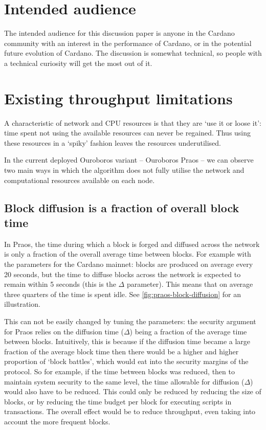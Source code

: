 \documentclass[11pt,a4paper]{article}
\begin{document}
\section*{Intended audience}

The intended audience for this discussion paper is anyone in the Cardano
community with an interest in the performance of Cardano, or in the potential
future evolution of Cardano. The discussion is somewhat technical, so people
with a technical curiosity will get the most out of it.

\tableofcontents{}

\section{Existing throughput limitations}

A characteristic of network and CPU resources is that they are `use it or loose
it': time spent not using the available resources can never be regained. Thus
using these resources in a `spiky' fashion leaves the resources underutilised.

In the current deployed Ouroboros variant -- Ouroboros Praos -- we can observe
two main ways in which the algorithm does not fully utilise the network and
computational resources available on each node.

\subsection{Block diffusion is a fraction of overall block time}

In Praos, the time during which a block is forged and diffused across the
network is only a fraction of the overall average time between blocks. For
example with the parameters for the Cardano mainnet: blocks are produced
on average every 20 seconds, but the time to diffuse blocks across the network
is expected to remain within 5 seconds (this is the $\Delta$ parameter). This
means that on average three quarters of the time is spent idle. See
\cref{fig:praos-block-diffusion} for an illustration.

This can not be easily changed by tuning the parameters: the security argument
for Praos relies on the diffusion time ($\Delta$) being a fraction of the
average time between blocks. Intuitively, this is because if the diffusion time
became a large fraction of the average block time then there would be a higher
and higher proportion of `block battles', which would eat into the security
margins of the protocol. So for example, if the time between blocks was reduced,
then to maintain system security to the same level, the time allowable for
diffusion ($\Delta$) would also have to be reduced. This could only be reduced
by reducing the size of blocks, or by reducing the time budget per block for
executing scripts in transactions. The overall effect would be to reduce
throughput, even taking into account the more frequent blocks.
\end{document}
